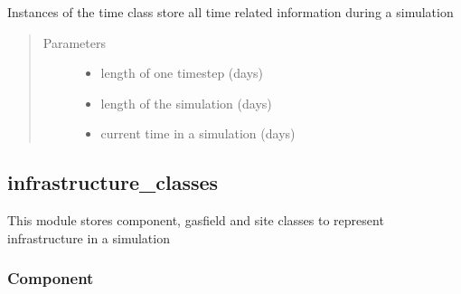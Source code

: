 \documentclass[letterpaper,10pt,english]{sphinxmanual}
\begin{document}
\begin{fulllineitems}
\label{\detokenize{index:feast.EmissionSimModules.simulation_classes.Time}}
Instances of the time class store all time related information during a simulation
\begin{quote}\begin{description}
\item[{Parameters}] \leavevmode\begin{itemize}
\item {} 
 \textendash{} length of one timestep (days)

\item {} 
 \textendash{} length of the simulation (days)

\item {} 
 \textendash{} current time in a simulation (days)

\end{itemize}

\end{description}\end{quote}

\end{fulllineitems}



\subsection{infrastructure\_classes}
\label{\detokenize{index:module-feast.EmissionSimModules.infrastructure_classes}}\label{\detokenize{index:infrastructure-classes}}
This module stores component, gasfield and site classes to represent infrastructure in a simulation


\subsubsection{Component}
\label{\detokenize{index:component}}
\end{document}
